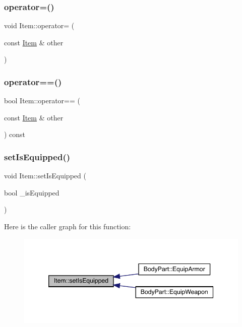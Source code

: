 \mbox{\label{class_item_a47267a43bfae3f28e183170f45783da5}} 
\subsubsection{\texorpdfstring{operator=()}{operator=()}}
{\footnotesize\ttfamily void Item\+::operator= (\begin{DoxyParamCaption}\item[{const \mbox{\hyperlink{class_item}{Item}} \&}]{other }\end{DoxyParamCaption})}

\mbox{\label{class_item_a754d81f7346aebb775b16969a89021b4}} 
\subsubsection{\texorpdfstring{operator==()}{operator==()}}
{\footnotesize\ttfamily bool Item\+::operator== (\begin{DoxyParamCaption}\item[{const \mbox{\hyperlink{class_item}{Item}} \&}]{other }\end{DoxyParamCaption}) const}

\mbox{\label{class_item_ade0d63a4f02aa1a97f977b13f96eb891}} 
\subsubsection{\texorpdfstring{set\+Is\+Equipped()}{setIsEquipped()}}
{\footnotesize\ttfamily void Item\+::set\+Is\+Equipped (\begin{DoxyParamCaption}\item[{bool}]{\+\_\+is\+Equipped }\end{DoxyParamCaption})}

Here is the caller graph for this function\+:
\nopagebreak
\begin{figure}[H]
\begin{center}
\leavevmode
\includegraphics[width=346pt]{class_item_ade0d63a4f02aa1a97f977b13f96eb891_icgraph}
\end{center}
\end{figure}
\mbox{\label{class_item_ae8dd38d585a7795f134f6453feb1000e}} 
